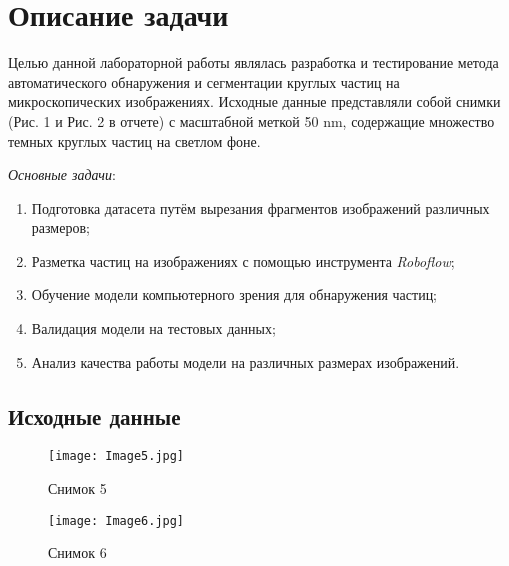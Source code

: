 \documentclass[12pt, a4paper]{report}
\begin{document}
	\section*{Описание задачи}
	\large
	Целью данной лабораторной работы являлась разработка и тестирование метода автоматического обнаружения и сегментации круглых частиц на микроскопических изображениях. Исходные данные представляли собой снимки (Рис. 1 и Рис. 2 в отчете) с масштабной меткой 50 nm, содержащие множество темных круглых частиц на светлом фоне. \par
	\textit{Основные задачи}:
	\begin{enumerate}
		\item Подготовка датасета путём вырезания фрагментов изображений различных размеров;
		\item Разметка частиц на изображениях с помощью инструмента \textit{Roboflow};
		\item Обучение модели компьютерного зрения для обнаружения частиц;
		\item Валидация модели на тестовых данных;
		\item Анализ качества работы модели на различных размерах изображений.
	\end{enumerate}

	\subsection*{Исходные данные}
	\large
	\begin{figure}[H]
		\texttt{[image: Image5.jpg]}
		\caption{Снимок 5}
	\end{figure}
	\begin{figure}[H]
		\texttt{[image: Image6.jpg]}
		\caption{Снимок 6}
	\end{figure}

	\newpage
\end{document}
